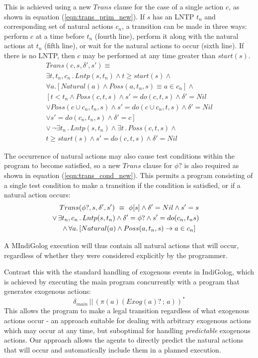 This is achieved using a new $Trans$ clause for the case of a single
action $c$, as shown in equation (\ref{eqn:trans_prim_new}). If
$s$ has an LNTP $t_{n}$ and corresponding set of natural actions
$c_{n}$, a transition can be made in three ways: perform $c$ at
a time before $t_{n}$ (fourth line), perform it along with the natural
actions at $t_{n}$ (fifth line), or wait for the natural actions
to occur (sixth line). If there is no LNTP, then $c$ may be performed
at any time greater than $start(s)$.\begin{multline}
Trans(c,s,\delta',s')\equiv\\
\exists t,t_{n},c_{n}\,.\, Lntp(s,t_{n})\wedge t\geq start(s)\wedge\\
\forall a.\left[Natural(a)\wedge Poss(a,t_{n},s)\equiv a\in c_{n}\right]\wedge\\
\left[t<t_{n}\wedge Poss(c,t,s)\wedge s'=do(c,t,s)\wedge\delta'=Nil\right.\\
\vee Poss(c\cup c_{n},t_{n},s)\wedge s'=do(c\cup c_{n},t,s)\wedge\delta'=Nil\\
\vee\left.s'=do(c_{n},t_{n},s)\wedge\delta'=c\right]\\
\vee\,\neg\exists t_{n}\,.\, Lntp(s,t_{n})\wedge\exists t\,.\, Poss(c,t,s)\wedge\\
t\geq start(s)\wedge s'=do(c,t,s)\wedge\delta'=Nil\label{eqn:trans_prim_new}\end{multline}


The occurrence of natural actions may also cause test conditions within
the program to become satisfied, so a new $Trans$ clause for $\phi?$
is also required as shown in equation (\ref{eqn:trans_cond_new}).
This permits a program consisting of a single test condition to make
a transition if the condition is satisfied, or if a natural action
occurs: \begin{multline}
Trans(\phi?,s,\delta',s')\,\,\equiv\,\,\phi[s]\wedge\delta'=Nil\wedge s'=s\\
\shoveright{\vee\,\exists t_{n},c_{n}\,.\, Lntp(s,t_{n})\wedge\delta'=\phi?\wedge s'=do(c_{n},t_{n}s)}\\
\wedge\,\forall a.\left[Natural(a)\wedge Poss(a,t_{n},s)\rightarrow a\in c_{n}\right]\label{eqn:trans_cond_new}\end{multline}


A MIndiGolog execution will thus contain all natural actions that
will occur, regardless of whether they were considered explicitly
by the programmer.

Contrast this with the standard handling of exogenous events in IndiGolog,
which is achieved by executing the main program concurrently with
a program that generates exogenous actions:\[
\delta_{main}\,||\,\left(\pi(a)(Exog(a)?\,;\, a)\right)^{*}\]
 This allows the program to make a legal transition regardless of
what exogenous actions occur - an approach suitable for dealing with
arbitrary exogenous actions which may occur at any time, but suboptimal
for handling \emph{predictable} exogenous actions. Our approach allows
the agents to directly predict the natural actions that will occur
and automatically include them in a planned execution.


